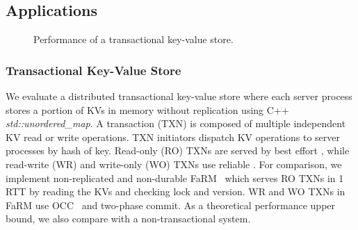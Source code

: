 \subsection{Applications}
\label{sec:application}


\begin{figure}[t]
	\centering
	\hspace{0.01\textwidth}
	\hspace{0.01\textwidth}
	\caption{Performance of a transactional key-value store.}
	\vspace{-15pt}
\end{figure}


\subsubsection{Transactional Key-Value Store}
\label{subsec:eval-kvs}


We evaluate a distributed transactional key-value store where each server process stores a portion of KVs in memory without replication using C++ \textit{std::unordered\_map}.
A transaction (TXN) is composed of multiple independent KV read or write operations.
TXN initiators dispatch KV operations to server processes by hash of key.
Read-only (RO) TXNs are served by best effort \sys{}, while read-write (WR) and write-only (WO) TXNs use reliable \sys{}.
For comparison, we implement non-replicated and non-durable FaRM~\cite{dragojevic2014farm} which serves RO TXNs in 1 RTT by reading the KVs and checking lock and version. WR and WO TXNs in FaRM use OCC~\cite{kung1981optimistic} and two-phase commit.
As a theoretical performance upper bound, we also compare with a non-transactional system.

